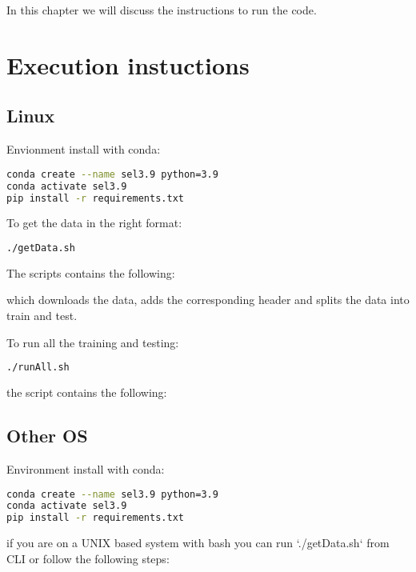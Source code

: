 In this chapter we will discuss the instructions to run the code.

\section{Execution instuctions}

\subsection{Linux}

Envionment install with conda:

\begin{lstlisting}[language=bash]
conda create --name sel3.9 python=3.9
conda activate sel3.9
pip install -r requirements.txt
\end{lstlisting}

To get the data in the right format:

\begin{lstlisting}[language=bash]
./getData.sh
\end{lstlisting}

The scripts contains the following:



which downloads the data, adds the corresponding header and splits the data into train and test.

To run all the training and testing:

\begin{lstlisting}[language=bash]
./runAll.sh
\end{lstlisting}

the script contains the following:



\subsection{Other OS}

Environment install with conda:

\begin{lstlisting}[language=bash]
conda create --name sel3.9 python=3.9
conda activate sel3.9
pip install -r requirements.txt
\end{lstlisting}

if you are on a UNIX based system with bash you can run `./getData.sh` from CLI or follow the following steps:


